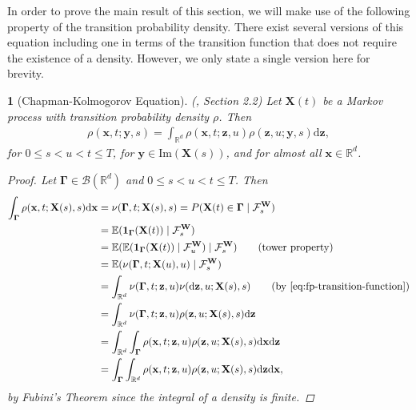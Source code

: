 \documentclass[english]{article}
\numberwithin{equation}{section}
\numberwithin{figure}{section}
\theoremstyle{bolddescit}
\newtheorem{theorem}{\protect\theoremname}[section]
\theoremstyle{definition}
\theoremstyle{definition}
\theoremstyle{plain}
\theoremstyle{plain}
\theoremstyle{bolddesc}
\theoremstyle{plain}
\theoremstyle{remark}
\providecommand{\theoremname}{Theorem}
\begin{document}
In order to prove the main result of this section, we will make use of the following property of the transition probability density. There exist several versions of this equation including one in terms of the transition function that does not require the existence of a density. However, we only state a single version here for brevity.

\begin{theorem}[Chapman-Kolmogorov Equation]\label{thm:fp-chapman-kolmogorov}
  (\cite{pavliotis_stochastic_2014}, Section 2.2)
  Let $\mathbf{X}(t)$ be a Markov process with transition probability density $\rho$. Then
  \begin{align*}
    \rho(\mathbf{x}, t; \mathbf{y}, s) = \int_{\mathbb{R}^d} \rho(\mathbf{x}, t; \mathbf{z}, u) \rho(\mathbf{z}, u; \mathbf{y}, s) \mathrm{d}\mathbf{z},
  \end{align*}
  for $0 \le s < u < t \le T$, for $\mathbf{y} \in \mathrm{Im}(\mathbf{X}(s))$, and for almost all $\mathbf{x} \in \mathbb{R}^d$.

  \begin{proof}
    Let $\mathbf{\Gamma} \in \mathcal{B}(\mathbb{R}^d)$ and $0 \le s < u < t \le T$. Then
    \begin{align*}
      \int_\mathbf{\Gamma} \rho(\mathbf{x},t;\mathbf{X}(s),s) \mathrm{d}\mathbf{x}
      &= \nu(\mathbf{\Gamma},t;\mathbf{X}(s),s)
      = P(\mathbf{X}(t) \in \mathbf{\Gamma} \mid \mathcal{F}^\mathbf{W}_s)\\
      &= \mathbb{E}(\mathbf{1}_\mathbf{\Gamma}(\mathbf{X}(t)) \mid \mathcal{F}^\mathbf{W}_s)\\
      &= \mathbb{E}(\mathbb{E}(\mathbf{1}_\mathbf{\Gamma}(\mathbf{X}(t)) \mid \mathcal{F}^\mathbf{W}_u) \mid \mathcal{F}^\mathbf{W}_s) \tag{tower property}\\
      &= \mathbb{E}(\nu(\mathbf{\Gamma},t;\mathbf{X}(u),u) \mid \mathcal{F}^\mathbf{W}_s)\\
      &= \int_{\mathbb{R}^d} \nu(\mathbf{\Gamma},t;\mathbf{z},u) \nu(\mathrm{d}\mathbf{z},u;\mathbf{X}(s),s) \tag{by \eqref{eq:fp-transition-function}}\\
      &= \int_{\mathbb{R}^d} \nu(\mathbf{\Gamma},t;\mathbf{z},u) \rho(\mathbf{z},u;\mathbf{X}(s),s) \mathrm{d}\mathbf{z}\\
      &= \int_{\mathbb{R}^d} \int_\mathbf{\Gamma} \rho(\mathbf{x},t;\mathbf{z},u) \rho(\mathbf{z},u;\mathbf{X}(s),s) \mathrm{d}\mathbf{x} \mathrm{d}\mathbf{z}\\
      &= \int_\mathbf{\Gamma} \int_{\mathbb{R}^d} \rho(\mathbf{x},t;\mathbf{z},u) \rho(\mathbf{z},u;\mathbf{X}(s),s) \mathrm{d}\mathbf{z} \mathrm{d}\mathbf{x},
    \end{align*}
    by Fubini's Theorem since the integral of a density is finite.


\end{proof}
\end{theorem}
\end{document}
